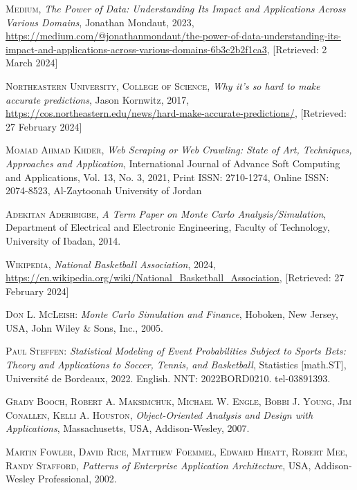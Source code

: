 \documentclass{thesis-ekf}
\theoremstyle{definition}
\theoremstyle{remark}
\begin{document}
\begin{thebibliography}{2}

\textsc{Medium}, 
\emph {The Power of Data: Understanding Its Impact and Applications Across Various Domains}, Jonathan Mondaut, 2023, \url{https://medium.com/@jonathanmondaut/the-power-of-data-understanding-its-impact-and-applications-across-various-domains-6b3c2b2f1ca3}, [Retrieved: 2 March 2024]

\textsc{Northeastern University, College of Science},
\emph{Why it’s so hard to make accurate predictions}, Jason Kornwitz, 2017, \url{https://cos.northeastern.edu/news/hard-make-accurate-predictions/}, [Retrieved: 27 February 2024]

\textsc{Moaiad Ahmad Khder},
\emph{Web Scraping or Web Crawling: State of Art, Techniques, Approaches and Application}, 
International Journal of Advance Soft Computing and Applications, 
Vol. 13, No. 3, 2021, 
Print ISSN: 2710-1274, Online ISSN: 2074-8523, 
Al-Zaytoonah University of Jordan

\textsc{Adekitan Aderibigbe},
\emph{A Term Paper on Monte Carlo Analysis/Simulation},
Department of Electrical and Electronic Engineering,
Faculty of Technology, University of Ibadan,
2014.

\textsc{Wikipedia},
\emph{National Basketball Association}, 2024, 
\url{https://en.wikipedia.org/wiki/National_Basketball_Association}, [Retrieved: 27 February 2024]

\textsc{Don L. McLeish}: 
\emph{Monte Carlo Simulation and Finance}, 
Hoboken, New Jersey, USA, John Wiley \& Sons, Inc., 2005.

\textsc{Paul Steffen}:
\emph{Statistical Modeling of Event Probabilities Subject to Sports Bets: Theory and Applications to Soccer, Tennis, and Basketball},
Statistics [math.ST], Université de Bordeaux, 2022.
English.
NNT: 2022BORD0210.
tel-03891393.

\textsc{Grady Booch, Robert A. Maksimchuk, Michael W. Engle, Bobbi J. Young, Jim Conallen, Kelli A. Houston},
\emph{Object-Oriented Analysis and Design with Applications}, 
Massachusetts, USA, Addison-Wesley, 2007.

\textsc{Martin Fowler, David Rice, Matthew Foemmel, Edward Hieatt, Robert Mee, Randy Stafford},
\emph{Patterns of Enterprise Application Architecture},
USA, Addison-Wesley Professional, 2002.


\end{thebibliography}
\end{document}
